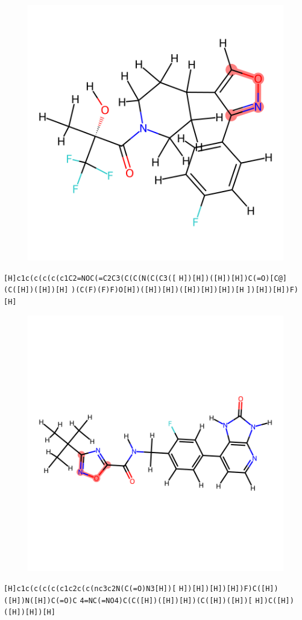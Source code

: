 \documentclass{article}
\begin{document}
\begin{figure}[ht]
\centering
    \includegraphics{mol100.png}
\end{figure}
\verb|[H]c1c(c(c(c(c1C2=NOC(=C2C3(C(C(N(C(C3([| \verb|H])[H])([H])[H])C(=O)[C@](C([H])([H])[H]| \verb|)(C(F)(F)F)O[H])([H])[H])([H])[H])[H])[H| \verb|])[H])[H])F)[H]|

\begin{figure}[ht]
\centering
    \includegraphics{mol101.png}
\end{figure}
\verb|[H]c1c(c(c(c(c1c2c(c(nc3c2N(C(=O)N3[H])[| \verb|H])[H])[H])[H])F)C([H])([H])N([H])C(=O)C| \verb|4=NC(=NO4)C(C([H])([H])[H])(C([H])([H])[| \verb|H])C([H])([H])[H])[H]|
\end{document}
